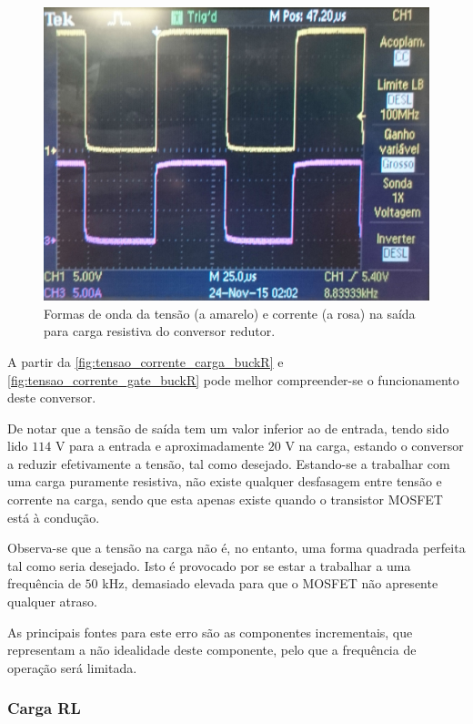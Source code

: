 \documentclass[a4paper,11pt]{article}
\numberwithin{equation}{section}
\begin{document}
\begin{figure}[h]
	\centering
	\includegraphics[keepaspectratio=true, scale=0.13]{img/figs/tensao_corrente_carga_buckR}
	\caption{Formas de onda da tensão (a amarelo) e corrente (a rosa) na saída para carga resistiva do conversor redutor.}
	\label{fig:tensao_corrente_carga_buckR}
	\vspace{-0.8em}
\end{figure} 

A partir da \autoref{fig:tensao_corrente_carga_buckR} e \autoref{fig:tensao_corrente_gate_buckR} pode melhor compreender-se o funcionamento deste conversor.

De notar que a tensão de saída tem um valor inferior ao de entrada, tendo sido lido $114$ V para a entrada e aproximadamente $20$ V na carga, estando o conversor a reduzir efetivamente a tensão, tal como desejado. Estando-se a trabalhar com uma carga puramente resistiva, não existe qualquer desfasagem entre tensão e corrente na carga, sendo que esta apenas existe quando o transistor MOSFET está à condução.

Observa-se que a tensão na carga não é, no entanto, uma forma quadrada perfeita tal como seria desejado. Isto é provocado por se estar a trabalhar a uma frequência de $50$ kHz, demasiado elevada para que o MOSFET não apresente qualquer atraso. 

As principais fontes para este erro são as componentes incrementais, que representam a não idealidade deste componente, pelo que a frequência de operação será limitada.

\subsubsection{Carga RL}
\end{document}
